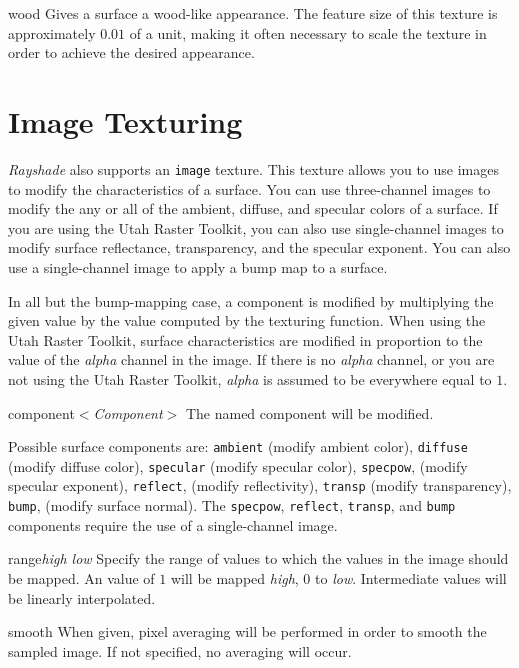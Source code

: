 \begin{defkey}{wood}{}
Gives a surface a wood-like appearance.  The feature size of this texture
is approximately $0.01$ of a unit, making it often necessary to
scale the texture in order to achieve the desired appearance.
\end{defkey}

\section {Image Texturing}

{\em Rayshade} also supports an {\tt image} texture.  This texture
allows you to use images to modify the characteristics of a surface.  You
can use three-channel images to modify the any or all of
the ambient, diffuse, and specular colors of a surface.
If you are using the Utah Raster Toolkit,
you can also use single-channel images to modify surface reflectance,
transparency, and the specular exponent.  You can also use a single-channel
image to apply a bump map to a surface.

In all but the bump-mapping case,
a component is modified by multiplying the given value by the value
computed by the texturing function.  When using the Utah Raster Toolkit,
surface characteristics are modified in proportion to the value of
the {\em alpha} channel in the image.  If there is no {\em alpha} channel,
or you are not using the Utah Raster Toolkit, {\em alpha} is assumed to be
everywhere
equal to $1$.

\begin{defkey}{component}{$<${\em Component}$>$}
	The named component will be modified.
\end{defkey}
Possible surface components are:
{\tt ambient} (modify ambient color),
{\tt diffuse} (modify diffuse color),
{\tt specular} (modify specular color),
{\tt specpow}, (modify specular exponent),
{\tt reflect},	(modify reflectivity),
{\tt transp} (modify transparency),
{\tt bump}, (modify surface normal).
The {\tt specpow}, {\tt reflect}, {\tt transp}, and {\tt bump}
components require the use of a single-channel image.

\begin{defkey}{range}{{\em high low}}
	Specify the range of values to which the values in the
	image should be mapped.  An value of $1$ will
	be mapped {\em high}, $0$ to {\em low}.  Intermediate
	values will be linearly interpolated.
\end{defkey}

\begin{defkey}{smooth}{}
	When given, pixel averaging will be performed in order
	to smooth the sampled image.  If not specified, no averaging
	will occur.
\end{defkey}

